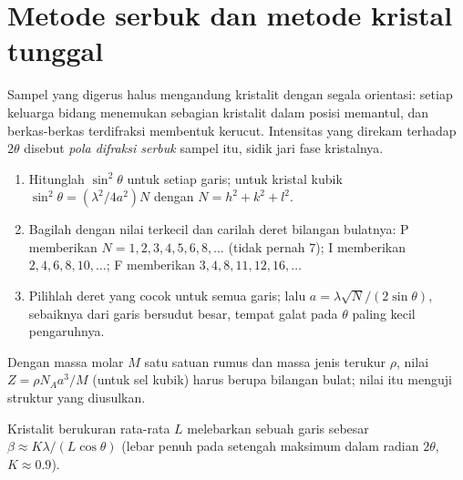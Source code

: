 \section{Metode serbuk dan metode kristal tunggal}

\begin{definition}\label{def:b3:x-ray-diffraction:powder}
Sampel yang digerus halus mengandung kristalit dengan segala orientasi: setiap
keluarga bidang menemukan sebagian kristalit dalam posisi memantul, dan
berkas-berkas terdifraksi membentuk kerucut. Intensitas yang direkam terhadap
$2\theta$ disebut \emph{pola difraksi serbuk}
sampel itu, sidik jari fase kristalnya.
\end{definition}

\begin{method}\label{met:b3:x-ray-diffraction:index-cubic}
\begin{enumerate}
  \item Hitunglah $\sin^2\theta$ untuk setiap garis; untuk kristal kubik
        $\sin^2\theta =
        (\lambda^2/4a^2)N$ dengan $N = h^2 + k^2 + l^2$.
  \item Bagilah dengan nilai terkecil dan carilah deret bilangan bulatnya: P
        memberikan $N = 1, 2, 3, 4, 5, 6, 8, \dots$ (tidak pernah 7); I
        memberikan $2, 4, 6, 8, 10, \dots$; F memberikan
        $3, 4, 8, 11, 12, 16, \dots$
  \item Pilihlah deret yang cocok untuk semua garis; lalu
        $a = \lambda\sqrt N/(2\sin\theta)$, sebaiknya dari garis bersudut besar,
        tempat galat pada $\theta$ paling kecil pengaruhnya.
\end{enumerate}
\end{method}

\begin{method}\label{met:b3:x-ray-diffraction:z-from-density}
Dengan massa molar $M$ satu satuan rumus dan massa jenis terukur $\rho$, nilai
$Z =
\rho N_Aa^3/M$ (untuk sel kubik) harus berupa bilangan bulat; nilai itu
menguji struktur yang diusulkan.
\end{method}

\begin{proposition}\label{prop:b3:x-ray-diffraction:scherrer}
Kristalit berukuran rata-rata $L$ melebarkan sebuah garis sebesar
$\beta \approx K\lambda/(L\cos\theta)$ (lebar penuh pada setengah maksimum dalam
radian $2\theta$, $K \approx 0.9$).
\end{proposition}
\admitted

